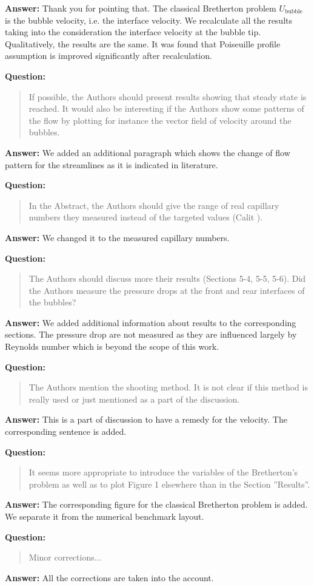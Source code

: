 \documentclass{article}
\begin{document}
\textbf{Answer:} Thank you for pointing that. The classical Bretherton problem
$U_{\mathrm{bubble}}$ is the bubble velocity, i.e. the interface velocity. We recalculate all the
results taking into the consideration the interface velocity at the bubble tip. Qualitatively, the
results are the same. It was found that Poiseuille profile assumption is improved significantly
after recalculation.

\textbf{Question:} 
\begin{quotation}
 If possible, the Authors should present results showing that steady state is reached. It would
also
be interesting if the Authors show some patterns of the ﬂow by plotting for instance the vector ﬁeld
of velocity around the bubbles.
\end{quotation}

\textbf{Answer:} We added an additional paragraph which shows the change of flow pattern for the
streamlines as it is indicated in literature.

\textbf{Question:}
\begin{quotation}
In the Abstract, the Authors should give the range of real capillary numbers they measured instead
of the targeted values (Calit ).
\end{quotation}

\textbf{Answer:} We changed it to the measured capillary numbers.

\textbf{Question:} 
\begin{quotation}
The Authors should discuss more their results (Sections 5-4, 5-5, 5-6). Did the Authors measure the
pressure drops at the front and rear interfaces of the bubbles?
\end{quotation}

\textbf{Answer:} We added additional information about results to the corresponding sections. The
pressure drop are not measured as they are influenced largely by Reynolds number which is beyond
the scope of this work.

\textbf{Question:}
\begin{quotation}
The Authors mention the shooting method. It is not clear if this method is really used or just
mentioned as a part of the discussion.
\end{quotation}

\textbf{Answer:} This is a part of discussion to have a remedy for the velocity. The corresponding
sentence is added.

\textbf{Question:}
\begin{quotation}
It seems more appropriate to introduce the variables of the Bretherton’s problem as well as to plot
Figure 1 elsewhere than in the Section ”Results”.
\end{quotation}

\textbf{Answer:} The corresponding figure for the classical Bretherton problem is added. We
separate it from the numerical benchmark layout.

\textbf{Question:}
\begin{quotation}
Minor corrections...
\end{quotation}

\textbf{Answer:} All the corrections are taken into the account.



\end{document}
